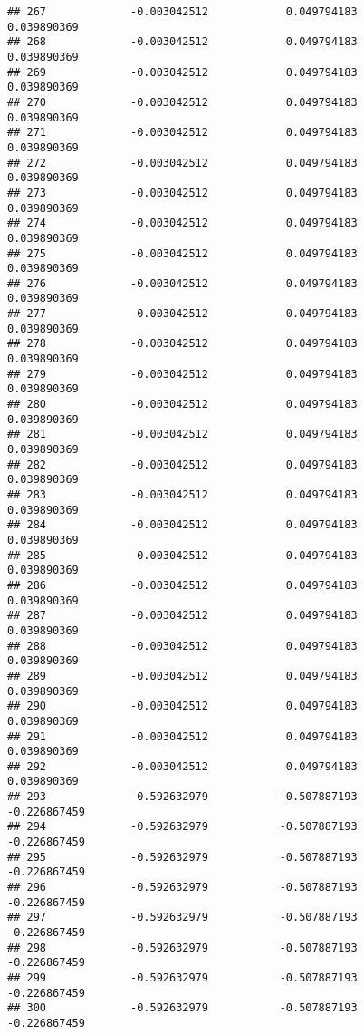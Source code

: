 \documentclass[]{article}
\begin{document}
\begin{verbatim}
## 267             -0.003042512            0.049794183            0.039890369
## 268             -0.003042512            0.049794183            0.039890369
## 269             -0.003042512            0.049794183            0.039890369
## 270             -0.003042512            0.049794183            0.039890369
## 271             -0.003042512            0.049794183            0.039890369
## 272             -0.003042512            0.049794183            0.039890369
## 273             -0.003042512            0.049794183            0.039890369
## 274             -0.003042512            0.049794183            0.039890369
## 275             -0.003042512            0.049794183            0.039890369
## 276             -0.003042512            0.049794183            0.039890369
## 277             -0.003042512            0.049794183            0.039890369
## 278             -0.003042512            0.049794183            0.039890369
## 279             -0.003042512            0.049794183            0.039890369
## 280             -0.003042512            0.049794183            0.039890369
## 281             -0.003042512            0.049794183            0.039890369
## 282             -0.003042512            0.049794183            0.039890369
## 283             -0.003042512            0.049794183            0.039890369
## 284             -0.003042512            0.049794183            0.039890369
## 285             -0.003042512            0.049794183            0.039890369
## 286             -0.003042512            0.049794183            0.039890369
## 287             -0.003042512            0.049794183            0.039890369
## 288             -0.003042512            0.049794183            0.039890369
## 289             -0.003042512            0.049794183            0.039890369
## 290             -0.003042512            0.049794183            0.039890369
## 291             -0.003042512            0.049794183            0.039890369
## 292             -0.003042512            0.049794183            0.039890369
## 293             -0.592632979           -0.507887193           -0.226867459
## 294             -0.592632979           -0.507887193           -0.226867459
## 295             -0.592632979           -0.507887193           -0.226867459
## 296             -0.592632979           -0.507887193           -0.226867459
## 297             -0.592632979           -0.507887193           -0.226867459
## 298             -0.592632979           -0.507887193           -0.226867459
## 299             -0.592632979           -0.507887193           -0.226867459
## 300             -0.592632979           -0.507887193           -0.226867459

\end{verbatim}
\end{document}
